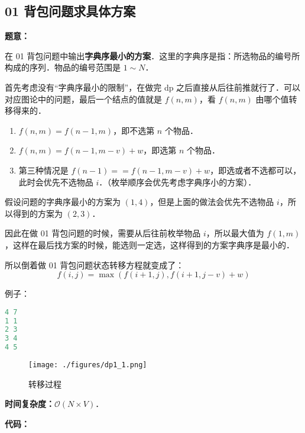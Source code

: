 \subsection{01 背包问题求具体方案}

\textbf{题意：}

在 01 背包问题中输出\textbf{字典序最小的方案}．这里的字典序是指：所选物品的编号所构成的序列．物品的编号范围是 $1 \sim N$．

首先考虑没有“字典序最小的限制”，在做完 dp 之后直接从后往前推就行了．可以对应图论中的问题，最后一个结点的值就是 $f(n, m)$，看 $f(n, m)$ 由哪个值转移得来的．

\begin{enumerate}
\item $f(n, m) = f(n - 1, m)$，即不选第 $n$ 个物品．
\item $f(n, m) = f(n - 1, m - v) + w$，即选第 $n$ 个物品．
\item 第三种情况是 $f(n - 1) == f(n - 1, m - v) + w$，即选或者不选都可以，此时会优先不选物品 $i$．（枚举顺序会优先考虑字典序小的方案）．
\end{enumerate}

假设问题的字典序最小的方案为 $(1, 4)$，但是上面的做法会优先不选物品 $i$，所以得到的方案为 $(2, 3)$．

因此在做 01 背包问题的时候，需要从后往前枚举物品 $i$，所以最大值为  $f(1, m)$，这样在最后找方案的时候，能选则一定选，这样得到的方案字典序是最小的．

所以倒着做 01 背包问题状态转移方程就变成了：
\begin{equation}
f(i, j) = \max(f(i + 1, j), f(i + 1, j - v) + w)
\end{equation}

例子：

\begin{lstlisting}[language=cpp]
4 7
1 1 
2 3 
3 4
4 5
\end{lstlisting}

\begin{figure}[ht]
\centering
\texttt{[image: ./figures/dp1\_1.png]}
\caption{转移过程} \label{dp1_fig1}
\end{figure}

\textbf{时间复杂度：}$\mathcal{O}(N \times V)$．

\textbf{代码：}

